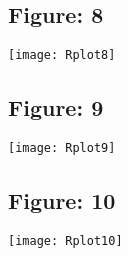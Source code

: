 \documentclass{article}
\begin{document}
\begin{figure}[ht!]
\subsection{Figure: 8}
\centering
\texttt{[image: Rplot8]}
\end{figure}

\begin{figure}[ht!]
\subsection{Figure: 9}
\centering
\texttt{[image: Rplot9]}
\end{figure}

\begin{figure}[ht!]
\subsection{Figure: 10}
\centering
\texttt{[image: Rplot10]}
\end{figure}
\end{document}
